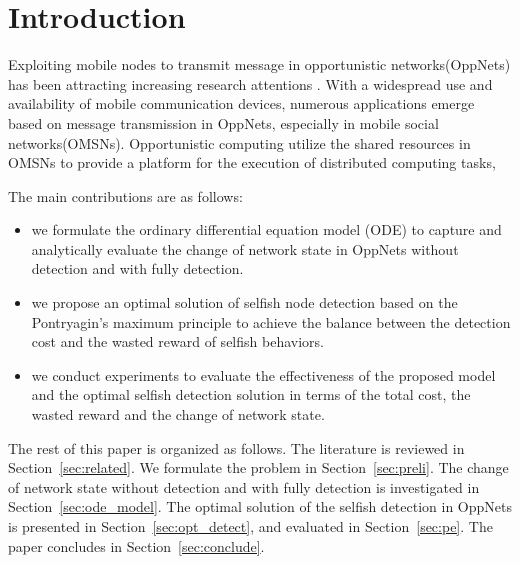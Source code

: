 \section{Introduction}
\label{sec:intro}
Exploiting mobile nodes to transmit message in
opportunistic networks(OppNets) has been attracting
increasing research attentions
\cite{DBLP:conf/sigcomm/SouzaMSMCC16,
DBLP:conf/infocom/LuSP16,
DBLP:conf/mobicom/RadenkovicH17,
DBLP:conf/infocom/SakaiSK19,
DBLP:journals/comsur/JedariXN18,
DBLP:journals/tmc/LoretiB20}.
With a widespread use and availability of
mobile communication devices, numerous applications
emerge based on message transmission in OppNets, especially in mobile social networks(OMSNs).
Opportunistic computing utilize the shared resources
in  OMSNs to provide a platform for the execution of
distributed computing tasks,

The main contributions are as follows:

\begin{itemize}
\item {we formulate the ordinary differential equation model (ODE)
to capture and analytically evaluate the change of network state
in OppNets without detection and with fully detection.}
\item {we propose an optimal solution of selfish node detection
based on the Pontryagin's maximum principle
to achieve the balance between the detection cost
and the wasted reward of selfish behaviors.
}
\item {we conduct experiments to evaluate
the effectiveness of the proposed model
and the optimal selfish detection solution in terms of the total cost,
the wasted reward and the change of network state.
}
\end{itemize}

The rest of this paper is organized as follows.
The literature is reviewed in Section~\ref{sec:related}.
We formulate the problem in Section~\ref{sec:preli}.
The change of network state without detection and with fully detection
is investigated in Section~\ref{sec:ode_model}.
The optimal solution of the selfish detection in OppNets
is presented in Section~\ref{sec:opt_detect},
and evaluated in Section~\ref{sec:pe}.
The paper concludes in Section~\ref{sec:conclude}.